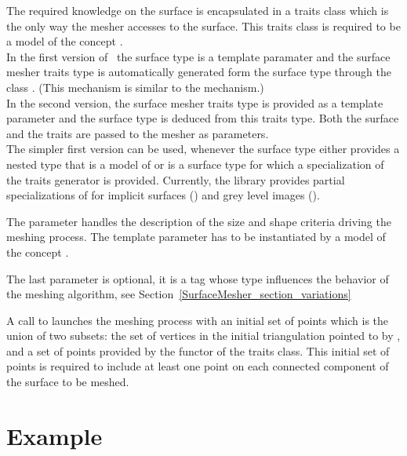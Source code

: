 The required knowledge on the surface is encapsulated in a
traits class  which is the only way the mesher
 accesses to the surface. This traits class is required to be a model
of the concept . \\
In the first  version
of  \ccRefName\, the surface type is a template paramater 
and the surface mesher traits type 
is  automatically generated form the surface type  through
the class 
.
(This mechanism is similar to the 
  mechanism.) \\
In the second version, the surface mesher traits type is provided
as a template parameter 
and the surface type is deduced from this traits type.
Both the surface and the traits 
are passed to the mesher as parameters. \\
The simpler first version can be used,
whenever the surface type either provides  a nested type
that is  a model of 
or is a surface type for which a specialization
of the traits generator 
is provided.
Currently, the library provides partial specializations
of  
for implicit surfaces () and 
grey level images ().



The parameter  handles the description of the size and shape
criteria driving the meshing process. The template parameter 
has to be instantiated by a model of the concept .


The last parameter is optional, it is a tag 
whose type influences the behavior of the
meshing algorithm, see Section~\ref{SurfaceMesher_section_variations}

A call to 
 launches 
the meshing process with an initial 
set of points which is the union of two subsets:
the set of vertices in the  initial triangulation pointed to by ,
and a set of points provided by the  functor 
of the traits class. This initial set of points is required 
to include at least one point on each connected component of the surface
to be meshed.


\section{Example}
\label{SurfaceMesher_section_example}


